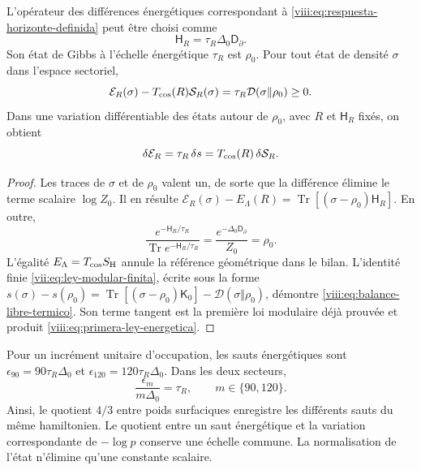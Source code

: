 \begin{theorem}
\label{viii:thm:hamiltoniano-respuesta-termica}
L'opérateur des différences énergétiques correspondant à \eqref{viii:eq:respuesta-horizonte-definida} peut être choisi comme
\begin{equation}
 \mathsf H_R=\tau_R\Delta_0\mathsf D_\partial.
 \label{viii:eq:hamiltoniano-respuesta}
\end{equation}
Son état de Gibbs à l'échelle énergétique \(\tau_R\) est \(\rho_0\).
Pour tout état de densité \(\sigma\) dans l'espace sectoriel,
\begin{equation}
 \mathcal E_R(\sigma)-T_{\rm cos}(R)\mathcal S_R(\sigma)
 =\tau_R\mathcal D(\sigma\Vert\rho_0)\geq0.
 \label{viii:eq:balance-libre-termico}
\end{equation}
Dans une variation différentiable des états autour de \(\rho_0\),
avec \(R\) et \(\mathsf H_R\) fixés, on obtient
\begin{equation}
 \delta\mathcal E_R
 =\tau_R\,\delta s
 =T_{\rm cos}(R)\,\delta\mathcal S_R.
 \label{viii:eq:primera-ley-energetica}
\end{equation}
\end{theorem}
\begin{proof}
Les traces de \(\sigma\) et de \(\rho_0\) valent un, de sorte que la différence élimine le terme scalaire \(\log Z_0\). Il en résulte \(\mathcal E_R(\sigma)-E_\Lambda(R)
=\operatorname{Tr}[(\sigma-\rho_0)\mathsf H_R]\). En outre,
\[
 \frac{e^{-\mathsf H_R/\tau_R}}
 {\operatorname{Tr}e^{-\mathsf H_R/\tau_R}}
 =\frac{e^{-\Delta_0\mathsf D_\partial}}{Z_0}=\rho_0.
\]
L'égalité \(E_\Lambda=T_{\rm cos}S_{\rm H}\) annule la
référence géométrique dans le bilan. L'identité finie
\eqref{vii:eq:ley-modular-finita}, écrite sous la forme
\(s(\sigma)-s(\rho_0)
=\operatorname{Tr}[(\sigma-\rho_0)\mathsf K_0]
-\mathcal D(\sigma\Vert\rho_0)\), démontre
\eqref{viii:eq:balance-libre-termico}. Son terme tangent est la
première loi modulaire déjà prouvée et produit
\eqref{viii:eq:primera-ley-energetica}.
\end{proof}

Pour un incrément unitaire d'occupation, les sauts énergétiques sont
\(\epsilon_{90}=90\tau_R\Delta_0\) et
\(\epsilon_{120}=120\tau_R\Delta_0\). Dans les deux secteurs,
\begin{equation}
 \frac{\epsilon_m}{m\Delta_0}=\tau_R,
 \qquad m\in\{90,120\}.
 \label{viii:eq:pendiente-termica-comun}
\end{equation}
Ainsi, le quotient \(4/3\) entre poids surfaciques enregistre les différents sauts du même hamiltonien. Le quotient entre un saut énergétique et la variation correspondante de \(-\log p\) conserve une échelle commune. La normalisation de l'état n'élimine qu'une constante scalaire.

